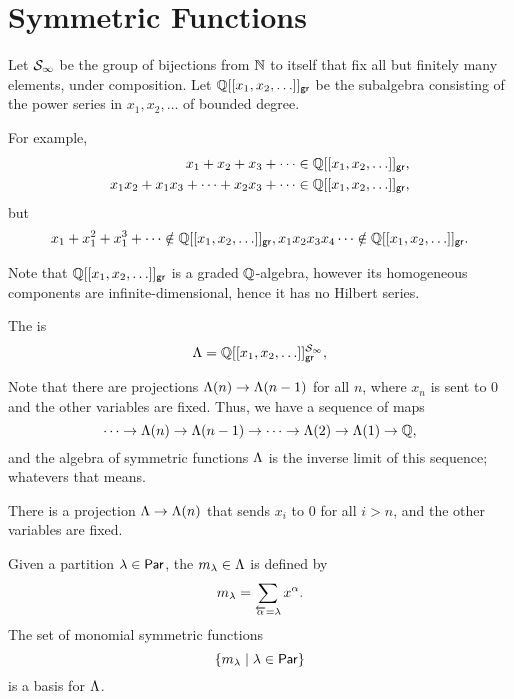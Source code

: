 \chapter{Symmetric Functions}

Let \(\mathcal{S}_{\infty}\) be the group of bijections from \(\mathbb{N}\) to itself that fix all but finitely many elements, under composition.
Let \(\mathbb{Q}[[x_1, x_2, \ldots]]_{\mathsf{gr}}\)
be the subalgebra consisting of the power series in \(x_1, x_2, \ldots\)
of bounded degree.

For example,
\begin{align*}
    x_1 + x_2 + x_3 + \cdots                   & \in \mathbb{Q}[[x_1, x_2, \ldots]]_{\mathsf{gr}}, \\
    x_1x_2 + x_1x_3 + \cdots + x_2x_3 + \cdots & \in \mathbb{Q}[[x_1, x_2, \ldots]]_{\mathsf{gr}},
\end{align*}
but
\begin{align*}
    x_1 + x_1^2 + x_1^3 + \cdots \notin \mathbb{Q}[[x_1, x_2, \ldots]]_{\mathsf{gr}},
    x_1x_2x_3x_4\cdots \notin \mathbb{Q}[[x_1, x_2, \ldots]]_{\mathsf{gr}}.
\end{align*}

Note that \(\mathbb{Q}[[x_1, x_2, \ldots]]_{\mathsf{gr}}\) is a graded \(\mathbb{Q}\)-algebra,
however its homogeneous components are infinite-dimensional,
hence it has no Hilbert series.

\begin{definition}
    The  is
    \[
        \operatorname{\Lambda} = \mathbb{Q}[[x_1, x_2, \ldots]]_{\mathsf{gr}}^{\mathcal{S}_{\infty}},
    \]
\end{definition}

Note that there are projections \(\operatorname{\Lambda}(n) \to \operatorname{\Lambda}(n-1)\) for all \(n\),
where \(x_n\) is sent to \(0\) and the other variables are fixed.
Thus, we have a sequence of maps
\[
    \cdots \to \operatorname{\Lambda}(n) \to \operatorname{\Lambda}(n-1) \to \cdots \to \operatorname{\Lambda}(2) \to \operatorname{\Lambda}(1) \to \mathbb{Q},
\]
and the algebra of symmetric functions \(\operatorname{\Lambda}\) is the inverse limit of this sequence; whatevers that means.

There is a projection \(\operatorname{\Lambda} \to \operatorname{\Lambda}(n)\) that sends \(x_i\) to \(0\) for all \(i > n\), and the other variables are fixed.

Given a partition \(\lambda \in \operatorname{\mathsf{Par}}\),
the  \(m_\lambda \in \operatorname{\Lambda}\) is defined by
\[
    m_\lambda = \sum_{\overleftarrow{\alpha} = \lambda} x^\alpha.
\]
The set of monomial symmetric functions
\[
    \{ m_\lambda \mid \lambda \in \operatorname{\mathsf{Par}} \}
\]
is a basis for \(\operatorname{\Lambda}\).

